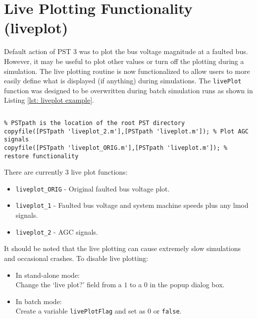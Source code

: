 \section{Live Plotting Functionality (liveplot)} 
Default action of PST 3 was to plot the bus voltage magnitude at a faulted bus.
However, it may be useful to plot other values or turn off the plotting during a simulation.
The live plotting routine is now functionalized to allow users to more easily define what is displayed (if anything) during simulations.
The \verb|livePlot| function was designed to be overwritten during batch simulation runs as shown in Listing \ref{lst: liveplot example}.

\begin{lstlisting}[caption={Live Plotting Overwrite Example},label={lst: liveplot example}]
\end{lstlisting}\vspace{-2 em}
\begin{verbatim}
% PSTpath is the location of the root PST directory
copyfile([PSTpath 'liveplot_2.m'],[PSTpath 'liveplot.m']); % Plot AGC signals 
copyfile([PSTpath 'liveplot_ORIG.m'],[PSTpath 'liveplot.m']); % restore functionality
\end{verbatim}

There are currently 3 live plot functions:

\begin{itemize}
 em
\item \verb|liveplot_ORIG| - Original faulted bus voltage plot.
\item \verb|liveplot_1| - Faulted bus voltage and system machine speeds plus any lmod signals.
\item \verb|liveplot_2| - AGC signals.
\end{itemize}

It should be noted that the live plotting can cause extremely slow simulations and occasional crashes.
To disable live plotting:
\begin{itemize}
 em
\item In stand-alone mode: \\Change the `live plot?' field from a $1$ to a $0$ in the popup dialog box.
\item In batch mode:  \\Create a variable \verb|livePlotFlag| and set as $0$ or \verb|false|.
\end{itemize}